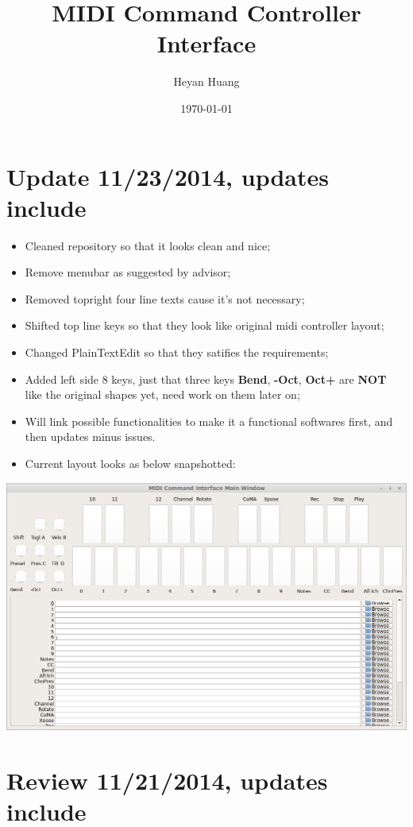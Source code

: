 \documentclass[9pt,b5paper]{article}
\author{Heyan Huang}
\date{\today}
\title{MIDI Command Controller Interface}
\begin{document}
\maketitle
\tableofcontents


\section{Update 11/23/2014, updates include}
\label{sec-1}
\begin{itemize}
\item Cleaned repository so that it looks clean and nice;
\item Remove menubar as suggested by advisor;
\item Removed topright four line texts cause it's not necessary;
\item Shifted top line keys so that they look like original midi controller layout;
\item Changed PlainTextEdit so that they satifies the requirements;
\item Added left side 8 keys, just that three keys \textbf{Bend}, \textbf{-Oct}, \textbf{Oct+} are \textbf{NOT} like the original shapes yet, need work on them later on;
\item Will link possible functionalities to make it a functional softwares first, and then updates minus issues.
\item Current layout looks as below snapshotted:
\end{itemize}

\includegraphics[width=.9\linewidth]{./pic/Screenshot_from_2014-11-23_13:20:06.png}  

\section{Review 11/21/2014, updates include}
\label{sec-2}
\end{document}
